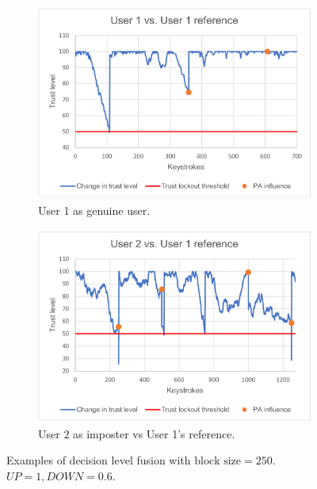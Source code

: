 \begin{figure}[htbp]
\centering
\begin{subfigure}[b]{0.8\textwidth}
   \includegraphics[width=1\linewidth]{figures/decision-lvl-genuine-250BL.pdf}
   \caption{User 1 as genuine user.}
   \label{fig:decision-lvl-genuine-250BL} 
\end{subfigure}

\begin{subfigure}[b]{0.8\textwidth}
   \includegraphics[width=1\linewidth]{figures/decision-lvl-user2-vs-user1-250BL.pdf}
   \caption{User 2 as imposter vs User 1's reference.}
   \label{fig:decision-lvl-user2-vs-user1-BL250}
\end{subfigure}

\caption{Examples of decision level fusion with $\text{block size} = 250$. $\textit{UP} = 1, \textit{DOWN} = 0.6$.}
\label{fig:decision-lvl-user1-example}
\end{figure}

